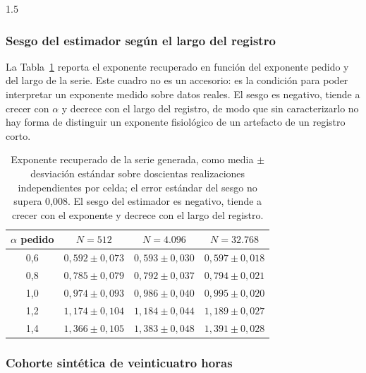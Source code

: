 \begin{spacing}{1.5}
\subsubsection{Sesgo del estimador según el largo del registro}

La Tabla~\ref{tab:sesgo} reporta el exponente recuperado en función del
exponente pedido y del largo de la serie. Este cuadro no es un accesorio: es la
condición para poder interpretar un exponente medido sobre datos reales. El
sesgo es negativo, tiende a crecer con $\alpha$ y decrece con el largo del
registro, de modo que sin caracterizarlo no hay forma de distinguir un
exponente fisiológico de un artefacto de un registro corto.

\begin{table}[H]
\centering
\begin{tabular}{|c|c|c|c|}
\hline
\textbf{$\alpha$ pedido} & \textbf{$N=512$} & \textbf{$N=4.096$} & \textbf{$N=32.768$} \\ \hline
0,6 & $0{,}592 \pm 0{,}073$ & $0{,}593 \pm 0{,}030$ & $0{,}597 \pm 0{,}018$ \\ \hline
0,8 & $0{,}785 \pm 0{,}079$ & $0{,}792 \pm 0{,}037$ & $0{,}794 \pm 0{,}021$ \\ \hline
1,0 & $0{,}974 \pm 0{,}093$ & $0{,}986 \pm 0{,}040$ & $0{,}995 \pm 0{,}020$ \\ \hline
1,2 & $1{,}174 \pm 0{,}104$ & $1{,}184 \pm 0{,}044$ & $1{,}189 \pm 0{,}027$ \\ \hline
1,4 & $1{,}366 \pm 0{,}105$ & $1{,}383 \pm 0{,}048$ & $1{,}391 \pm 0{,}028$ \\ \hline
\end{tabular}
\caption{Exponente recuperado de la serie generada, como media $\pm$ desviación estándar sobre doscientas realizaciones independientes por celda; el error estándar del sesgo no supera 0,008. El sesgo del estimador es negativo, tiende a crecer con el exponente y decrece con el largo del registro.}
\label{tab:sesgo}
\end{table}

\subsubsection{Cohorte sintética de veinticuatro horas}


\end{spacing}
